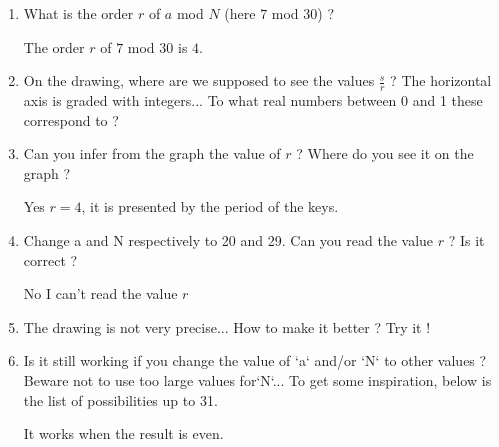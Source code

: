 \documentclass{article}
\theoremstyle{plain}
\begin{document}
    \begin{enumerate}
      \item What is the order $r$ of $a$ mod $N$ (here $7$ mod $30$) ?

        The order $r$ of $7$ mod $30$ is $4$.

      \item On the drawing, where are we supposed to see the values $\frac{s}{r}$ ?
        The horizontal axis is graded with integers... To what real numbers
        between 0 and 1 these correspond to ?

      \item Can you infer from the graph the value of $r$ ? Where do you see it
        on the graph ?

        Yes $r = 4$, it is presented by the period of the keys.

      \item Change a and N respectively to 20 and 29. Can you read the value $r$ ? Is it correct ?

        No I can't read the value $r$

      \item The drawing is not very precise... How to make it better ? Try it !

      \item Is it still working if you change the value of `a` and/or `N` to
        other values ? Beware not to use too large values for`N`... To get some
        inspiration, below is the list of possibilities up to 31.

        It works when the result is even.
    \end{enumerate}
\end{document}
